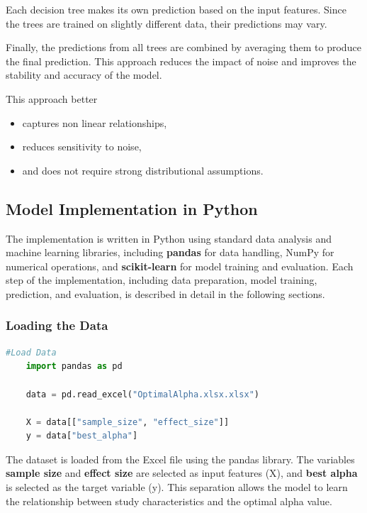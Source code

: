 {Each decision tree makes its own prediction based on the input features. Since the trees are trained on slightly different data, their predictions may vary.

Finally, the predictions from all trees are combined by averaging them to produce the final prediction. This approach reduces the impact of noise and improves the stability and accuracy of the model\cite{Ha2023}.

This approach better

\begin{itemize}
	\item captures non linear relationships,
	\item reduces sensitivity to noise,
	\item and does not require strong distributional assumptions.\cite{Ryo2017}
\end{itemize}


\subsection{Model Implementation in Python}

The implementation is written in Python using standard data analysis and machine learning libraries, including \textbf{pandas} for data handling, NumPy for numerical operations, and \textbf{scikit-learn} for model training and evaluation. Each step of the implementation, including data preparation, model training, prediction, and evaluation, is described in detail in the following sections.

\subsubsection*{Loading the Data}

\begin{lstlisting}[language=Python]
	#Load Data
	import pandas as pd
	
	data = pd.read_excel("OptimalAlpha.xlsx.xlsx")
	
	X = data[["sample_size", "effect_size"]]
	y = data["best_alpha"]
\end{lstlisting}

The dataset is loaded from the Excel file using the pandas library. The variables \textbf{sample size} and \textbf{effect size} are selected as input features (X), and \textbf{best alpha} is selected as the target variable (y). This separation allows the model to learn the relationship between study characteristics and the optimal alpha value.

}
